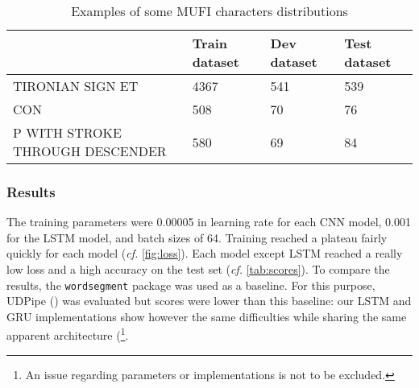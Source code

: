\documentclass{jdmdh}
\begin{document}
\begin{table}[!ht]
\begin{tabular}{llll}
\hline
                                                   & Train dataset & Dev dataset & Test dataset \\ \hline
TIRONIAN SIGN ET                                   & 4367          & 541         & 539          \\
CON                             & 508           & 70          & 76           \\
P WITH STROKE THROUGH DESCENDER & 580           & 69          & 84           \\ \hline
\end{tabular}
  \caption{Examples of some MUFI characters distributions}
  \label{tab:mufi_examples}
\end{table}

\subsubsection{Results}

The training parameters were 0.00005 in learning rate for each CNN model, 0.001 for the LSTM model, and batch sizes of 64. Training reached a plateau fairly quickly for each model (\textit{cf.} \ref{fig:loss}). Each model except LSTM reached a really low loss and a high accuracy on the test set (\textit{cf.} \ref{tab:scores}). To compare the results, the \texttt{wordsegment} package \citet{WordSegment} was used as a baseline. For this purpose, UDPipe (\citet{udpipe:2017}) was evaluated but scores were lower than this baseline: our LSTM and GRU implementations show however the same difficulties while sharing the same apparent architecture (\footnote{An issue regarding parameters or implementations is not to be excluded.}.
\end{document}
